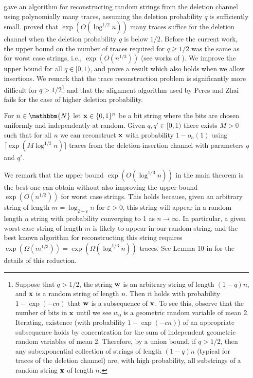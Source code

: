 \documentclass[final,12pt]{colt2018} %
\newcommand{\N}{\mathbbm{N}}
\newcommand{\eps}{\varepsilon}
\newcommand{\1}{\mathbf{1}}
\newcommand{\rta}{\rightarrow}
\def\x{{\bf x}}
\def\w{{\bf w}}
\begin{document}
\citet*{HMPW08} gave an algorithm for reconstructing random strings from the deletion channel using polynomially many traces, assuming the deletion probability $q$ is sufficiently small. \cite{PZ17} proved that $\exp(O( \log^{1/2}n ))$ many traces suffice for the deletion channel when the deletion probability $q$
is below $1/2$. Before the current work, the upper bound on the number of traces required for
$q \geq 1/2$ was the same as for worst case strings, i.e.,
$\exp(O( n^{1/3} ))$ (see works of \citet*{DOS16,NP16}).  We improve the
upper bound for all $q\in[0,1)$, and prove a result which
also holds when we allow insertions.  We remark that the trace reconstruction problem is significantly more difficult for $q>1/2$\footnote{Suppose that $q>1/2$, the string $\w$ is an arbitrary string of length $(1-q)n$, and $\x$ is a random string of length $n$. Then it holds with probability $1-\exp(-cn)$ that $\w$ is a subsequence of $\x$. To see this, observe that the number of bits in $\x$ until we see $w_0$ is a geometric random variable of mean 2. Iterating,  existence (with probability $1-\exp(-cn)$) of an appropriate subsequence holds by concentration for the sum of independent geometric random variables of mean 2. Therefore, by a union bound, if $q>1/2$, then any subexponential collection of strings of length $(1-q)n$ (typical for traces of the deletion channel) are, with high probability, all substrings of a random  string $\x$ of length $n$.} and that the alignment algorithm used by Peres and Zhai fails for the case of higher deletion probability.
\begin{theorem}\label{th:main}
	For $n\in\N$ let $\x\in\{0,1 \}^n$ be a bit string where the bits
	are chosen uniformly and independently at random.  Given $q,q'\in[0,1)$
	there exists $M>0$ such that for all $n$ we can reconstruct $\x$
	with probability $1-o_n(1)$ using $\lceil\exp(M\log^{1/3}n)\rceil$ traces
	from the deletion-insertion channel with parameters $q$ and $q'$.
\end{theorem}
%
We remark that the upper bound $\exp(O(\log^{1/3} n))$ in
the main theorem is the best one can obtain without also
improving the upper bound $\exp(O(n^{1/3}))$ for worst case strings.
This holds because, given an arbitrary string of length
$m = \log_{2+\eps} n$ for $\eps>0$, this string will appear
in a random length $n$ string with probability converging to 1 as
$n\rta\infty$.  In particular, a given worst case string of length $m$
is likely to appear in our random string, and the best known algorithm
for reconstructing this string requires $\exp(\Omega(m^{1/3}))
= \exp(\Omega(\log^{1/3} n))$ traces. See Lemma 10 in \cite{MPV14} for the details of this reduction.
\end{document}
